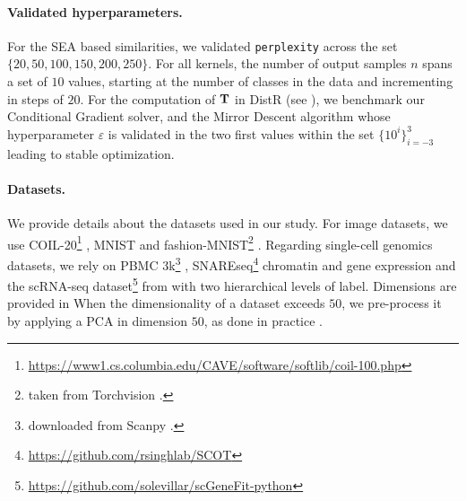 \paragraph{Validated hyperparameters.} For the SEA based similarities, we validated \texttt{perplexity} across the set $\{20, 50, 100, 150, 200, 250\}$. For all kernels, the number of output samples $n$ spans a set of $10$ values, starting at the number of classes in the data and incrementing in steps of $20$. For the computation of ${\mathbf{T}}$ in DistR (see ), we benchmark our Conditional Gradient solver, and the Mirror Descent algorithm whose hyperparameter $\varepsilon$ is validated in the two first values within the set $\{10^{i}\}_{i=-3}^3$ leading to stable optimization.

\paragraph{Datasets.}
We provide details about the datasets used in our study. 
For image datasets, we use COIL-20\footnote{\url{https://www1.cs.columbia.edu/CAVE/software/softlib/coil-100.php}} \citep{nene1996columbia}, MNIST and fashion-MNIST\footnote{taken from Torchvision \citep{marcel2010torchvision}.} \citep{xiao2017fashion}. Regarding single-cell genomics datasets, we rely on PBMC 3k\footnote{downloaded from Scanpy \citep{wolf2018scanpy}.} \citep{wolf2018scanpy}, SNAREseq\footnote{\url{https://github.com/rsinghlab/SCOT}} chromatin and gene expression \citep{chen2019high} and the scRNA-seq dataset\footnote{\url{https://github.com/solevillar/scGeneFit-python}} from \citep{zeisel2015cell} with two hierarchical levels of label. 
Dimensions are provided in 
When the dimensionality of a dataset exceeds $50$, we pre-process it by applying a PCA in dimension $50$, as done in practice \citep{van2008visualizing}.

\begin{table}[h!] \vspace{-5mm}
\centering
\caption{Dataset Sizes.}\label{tab:dataset_details}
\end{table}


